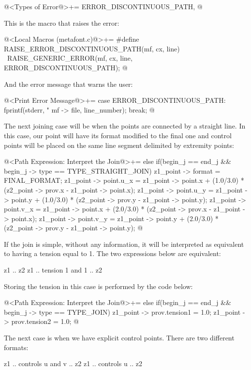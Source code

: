 {{{{{\iniciocodigo
@<Types of Error@>+=
ERROR_DISCONTINUOUS_PATH,
@
\fimcodigo

This is the macro that raises the error:

\iniciocodigo
@<Local Macros (metafont.c)@>+=
#define RAISE_ERROR_DISCONTINUOUS_PATH(mf, cx, line) {\
  RAISE_GENERIC_ERROR(mf, cx, line, ERROR_DISCONTINUOUS_PATH);}
@
\fimcodigo

And the error message that warns the user:

\iniciocodigo
@<Print Error Message@>+=
case ERROR_DISCONTINUOUS_PATH:
  fprintf(stderr,
          "%
          mf -> file, line_number);
  break;
@
\fimcodigo

The next joining case will be when the points are connected by a
straight line. In this case, our point will have its format modified
to the final one and control points will be placed on the same line
segment delimited by extremity points:

\iniciocodigo
@<Path Expression: Interpret the Join@>+=
else if(begin_j == end_j && begin_j -> type == TYPE_STRAIGHT_JOIN){
  z1_point -> format = FINAL_FORMAT;
  z1_point -> point.u_x = z1_point -> point.x + (1.0/3.0) *
                         (z2_point -> prov.x - z1_point -> point.x);
  z1_point -> point.u_y = z1_point -> point.y + (1.0/3.0) *
                         (z2_point -> prov.y - z1_point -> point.y);
  z1_point -> point.v_x = z1_point -> point.x + (2.0/3.0) *
                         (z2_point -> prov.x - z1_point -> point.x);
  z1_point -> point.v_y = z1_point -> point.y + (2.0/3.0) *
                         (z2_point -> prov.y - z1_point -> point.y);
}
@
\fimcodigo

If the join is simple, without any information, it will be interpreted
as equivalent to having a tension equal to 1. The two expressions
below are equivalent:

\alinhaverbatim
z1 .. z2
z1 .. tension 1 and 1 .. z2
\alinhanormal

Storing the tension in this case is performed by the code below:

\iniciocodigo
@<Path Expression: Interpret the Join@>+=
else if(begin_j == end_j && begin_j -> type == TYPE_JOIN){
  z1_point -> prov.tension1 = 1.0;
  z1_point -> prov.tension2 = 1.0;
}
@
\fimcodigo

The next case is when we have explicit control points. There are two
different formats:

\alinhaverbatim
z1 .. controls u and v .. z2
z1 .. controls u .. z2
\alinhanormal

}}}}}
